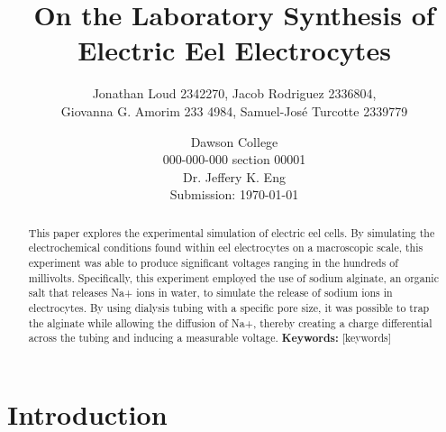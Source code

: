 \documentclass[letterpaper]{article}
\title{On the Laboratory Synthesis of Electric Eel Electrocytes}
\author{Jonathan Loud 2342270, Jacob Rodriguez 2336804, \\
Giovanna G. Amorim 233 4984, Samuel-José Turcotte 2339779}
\date{Dawson College \\[15pt]
000-000-000 section 00001\\[15pt]
Dr. Jeffery K. Eng\\[15pt]
Submission: \today}
\begin{document}
\maketitle

\begin{abstract}
    This paper explores the experimental simulation of electric eel cells. By simulating the electrochemical 
	conditions found within eel electrocytes on a macroscopic scale, this experiment was able to produce 
	significant voltages ranging in the hundreds of millivolts. Specifically, this experiment employed 
	the use of sodium alginate, an organic salt that releases Na+ ions in water, to simulate the release of sodium 
	ions in electrocytes. By using dialysis tubing with a specific pore size, it was possible to trap the alginate 
	while allowing the diffusion of Na+, thereby creating a charge differential across the tubing and inducing a measurable
	voltage.
	\noindent\textbf{Keywords:} [keywords]
\end{abstract}

\tableofcontents

\newpage

\section{Introduction}
\label{sec:introduction}
\end{document}
